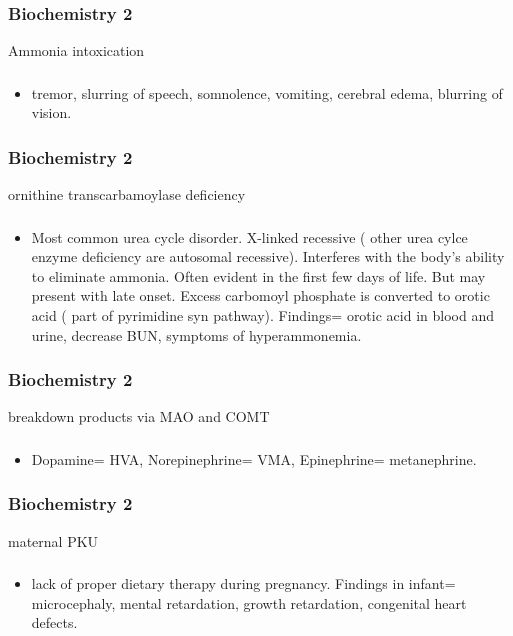 \documentclass[11pt]{beamer}
\begin{document}
\begin{frame}
 \frametitle{Biochemistry 2}
Ammonia intoxication
\end{frame}

\begin{frame}
 \frametitle{}
\begin{itemize}
\item tremor, slurring of speech, somnolence, vomiting, cerebral edema, blurring of vision.
\end{itemize}
\end{frame}

\begin{frame}
 \frametitle{Biochemistry 2}
ornithine transcarbamoylase deficiency 
\end{frame}

\begin{frame}
 \frametitle{}
\begin{itemize}
\item Most common urea cycle disorder. X-linked recessive ( other urea cylce enzyme deficiency are autosomal recessive). Interferes with the body's ability to eliminate ammonia. Often evident in the first few days of life. But may present with late onset. Excess carbomoyl phosphate is converted to orotic acid ( part of pyrimidine syn pathway). Findings= orotic acid in blood and urine, decrease BUN, symptoms of hyperammonemia. 
\end{itemize}
\end{frame}

\begin{frame}
 \frametitle{Biochemistry 2}
breakdown products via MAO and COMT 
\end{frame}

\begin{frame}
 \frametitle{}
\begin{itemize}
\item  Dopamine= HVA, Norepinephrine= VMA,  Epinephrine= metanephrine. 
\end{itemize}
\end{frame}

\begin{frame}
 \frametitle{Biochemistry 2}
maternal PKU 
\end{frame}

\begin{frame}
 \frametitle{}
\begin{itemize}
\item lack of proper dietary therapy during pregnancy. Findings in infant= microcephaly, mental retardation, growth retardation, congenital heart defects. 
\end{itemize}
\end{frame}
\end{document}
